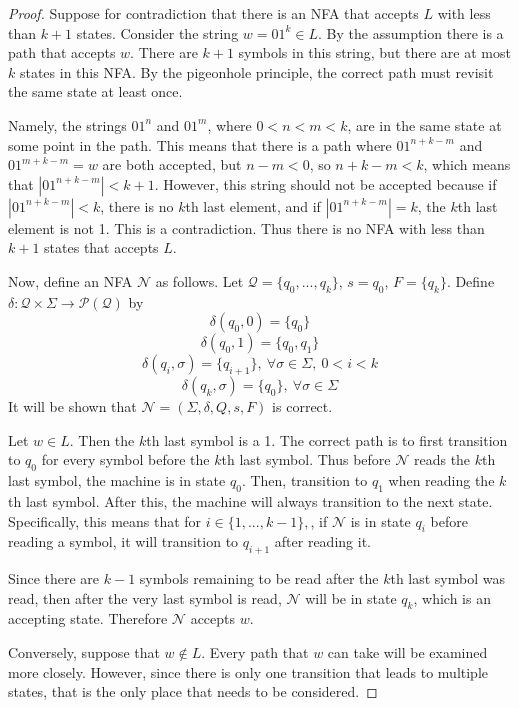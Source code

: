 \documentclass[11pt]{article}
\begin{document}
\begin{enumerate}[label=\textbf{Q\arabic*.}]
\begin{enumerate}[label=\textit{\alph*)}]
\begin{proof}
	Suppose for contradiction that there is an NFA that accepts \(L\) with less than \(k + 1\) states. Consider the string \(w = 01^k \in L\). By the assumption there is a path that accepts \(w\). There are \(k+1\) symbols in this string, but there are at most \(k\) states in this NFA. By the pigeonhole principle, the correct path must revisit the same state at least once.
	
	Namely, the strings \(01^n\) and \(01^m\), where \(0 < n < m < k\), are in the same state at some point in the path. This means that there is a path where \(01^{n+k-m}\) and \(01^{m+k-m} = w\) are both accepted, but \(n - m < 0\), so \(n + k - m < k\), which means that \(|01^{n+k-m}| < k+1\). However, this string should not be accepted because if \(|01^{n+k-m}| < k\), there is no \(k\)th last element, and if \(|01^{n+k-m}| = k\), the \(k\)th last element is not 1. This is a contradiction. Thus there is no NFA with less than \(k+1\) states that accepts \(L\).

	Now, define an NFA \(\mathcal{N}\) as follows. Let \(\mathcal{Q} = \{q_0, ..., q_k\}\), \(s = q_0\), \(F = \{q_k\}\). Define \(\delta : \mathcal{Q} \times \Sigma \to \mathcal{P} (\mathcal{Q})\) by
	\[
		\delta (q_0, 0) = \{ q_0 \} 
	\]
	\[
		\delta (q_0, 1) = \{ q_0,q_1 \} 
	\]
	\[
		\delta (q_i, \sigma ) = \{ q_{i+1} \} ,\ \forall \sigma \in \Sigma,\ 0 < i < k
	\]
	\[
		\delta (q_k, \sigma) = \{q_0\},\ \forall \sigma \in \Sigma 
	\]
	It will be shown that \(\mathcal{N} = (\Sigma , \delta , Q, s, F)\) is correct.

	Let \(w \in L\). Then the \(k\)th last symbol is a 1. The correct path is to first transition to \(q_0\) for every symbol before the \(k\)th last symbol. Thus before \(\mathcal{N}\) reads the \(k\)th last symbol, the machine is in state \(q_0\). Then, transition to \(q_1\) when reading the \(k\)th last symbol. After this, the machine will always transition to the next state. Specifically, this means that for \(i \in \{1, ..., k-1 \},\), if \(\mathcal{N}\) is in state \(q_i\) before reading a symbol, it will transition to \(q_{i+1}\) after reading it.

	Since there are \(k-1\) symbols remaining to be read after the \(k\)th last symbol was read, then after the very last symbol is read, \(\mathcal{N}\) will be in state \(q_k\), which is an accepting state. Therefore \(\mathcal{N}\) accepts \(w\).

	Conversely, suppose that \(w \notin L\). Every path that \(w\) can take will be examined more closely. However, since there is only one transition that leads to multiple states, that is the only place that needs to be considered.


\end{proof}
\end{enumerate}
\end{enumerate}
\end{document}
